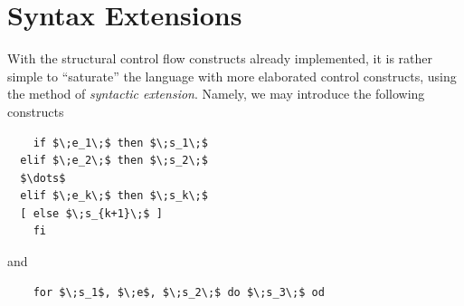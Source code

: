 \documentclass{article}
\def\transarrow{\xrightarrow}
\def\padding{\phantom{X}}
\def\subarrow{}
\newcommand{\trule}[2]{\frac{#1}{#2}}
\newcommand{\crule}[3]{\frac{#1}{#2},\;{#3}}
\newcommand{\withenv}[2]{{#1}\vdash{#2}}
\newcommand{\trans}[3]{{#1}\transarrow{\padding{\textstyle #2}\padding}\subarrow{#3}}
\newcommand{\llang}[1]{\mbox{\lstinline[mathescape]|#1|}}
\newcommand{\inbr}[1]{\left<{#1}\right>}
\newcommand{\ruleno}[1]{\eqno[\scriptsize\textsc{#1}]}
\newcommand{\sembr}[1]{\llbracket{#1}\rrbracket}
\theoremstyle{definition}
\begin{document}

\section{Syntax Extensions}

With the structural control flow constructs already implemented, it is rather simple to ``saturate'' the language with more elaborated control constructs, using
the method of \emph{syntactic extension}. Namely, we may introduce the following constructs

\begin{lstlisting}
    if $\;e_1\;$ then $\;s_1\;$
  elif $\;e_2\;$ then $\;s_2\;$
  $\dots$
  elif $\;e_k\;$ then $\;s_k\;$
  [ else $\;s_{k+1}\;$ ]
    fi
\end{lstlisting}

and

\begin{lstlisting}
    for $\;s_1$, $\;e$, $\;s_2\;$ do $\;s_3\;$ od
\end{lstlisting}
\end{document}
